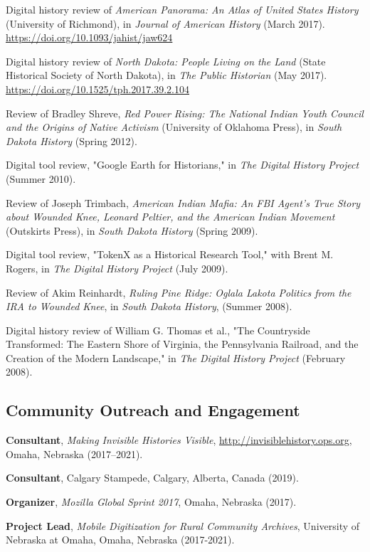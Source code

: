 \documentclass[10pt]{article}
\begin{document}
Digital history review of \textit{American Panorama: An Atlas of United States History} (University of Richmond), in \textit{Journal of American History} (March 2017). \url{https://doi.org/10.1093/jahist/jaw624}

Digital history review of \textit{North Dakota: People Living on the Land} (State Historical Society of North Dakota), in \textit{The Public Historian} (May 2017). \url{https://doi.org/10.1525/tph.2017.39.2.104}

Review of Bradley Shreve, \textit{Red Power Rising: The National Indian Youth Council and the Origins of Native Activism} (University of Oklahoma Press), in \textit{South Dakota History} (Spring 2012).

Digital tool review, "Google Earth for Historians," in \textit{The Digital History Project} (Summer 2010).

Review of Joseph Trimbach, \textit{American Indian Mafia: An FBI Agent's True Story about Wounded Knee, Leonard Peltier, and the American Indian Movement} (Outskirts Press), in \textit{South Dakota History} (Spring 2009).

Digital tool review, "TokenX as a Historical Research Tool," with Brent M. Rogers, in \textit{The Digital History Project} (July 2009).

Review of Akim Reinhardt, \textit{Ruling Pine Ridge: Oglala Lakota Politics from the IRA to Wounded Knee}, in \textit{South Dakota History}, (Summer 2008).

Digital history review of William G. Thomas et al., "The Countryside Transformed: The Eastern Shore of Virginia, the Pennsylvania Railroad, and the Creation of the Modern Landscape," in \textit{The Digital History Project} (February 2008).

\subsection{Community Outreach and Engagement}

\textbf{Consultant}, \textit{Making Invisible Histories Visible}, \url{http://invisiblehistory.ops.org}, Omaha, Nebraska (2017--2021).

\textbf{Consultant}, Calgary Stampede, Calgary, Alberta, Canada (2019).

\textbf{Organizer}, \textit{Mozilla Global Sprint 2017}, Omaha, Nebraska (2017).

\textbf{Project Lead}, \textit{Mobile Digitization for Rural Community Archives}, University of Nebraska at Omaha, Omaha, Nebraska (2017-2021).
\end{document}
